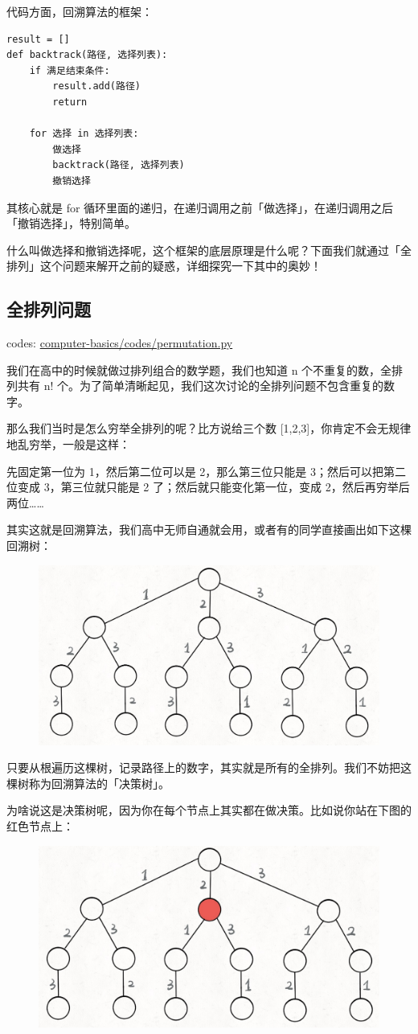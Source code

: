\documentclass[12pt]{article}
\begin{document}
代码方面，回溯算法的框架：
\begin{lstlisting}
result = []
def backtrack(路径, 选择列表):
    if 满足结束条件:
        result.add(路径)
        return
    
    for 选择 in 选择列表:
        做选择
        backtrack(路径, 选择列表)
        撤销选择
\end{lstlisting}

其核心就是 for 循环里面的递归，在递归调用之前「做选择」，在递归调用之后「撤销选择」，特别简单。

什么叫做选择和撤销选择呢，这个框架的底层原理是什么呢？下面我们就通过「全排列」这个问题来解开之前的疑惑，详细探究一下其中的奥妙！

\subsection{全排列问题}
codes: \url{computer-basics/codes/permutation.py}

我们在高中的时候就做过排列组合的数学题，我们也知道 n 个不重复的数，全排列共有 n! 个。为了简单清晰起见，我们这次讨论的全排列问题不包含重复的数字。

那么我们当时是怎么穷举全排列的呢？比方说给三个数 [1,2,3]，你肯定不会无规律地乱穷举，一般是这样：

先固定第一位为 1，然后第二位可以是 2，那么第三位只能是 3；然后可以把第二位变成 3，第三位就只能是 2 了；然后就只能变化第一位，变成 2，然后再穷举后两位……

其实这就是回溯算法，我们高中无师自通就会用，或者有的同学直接画出如下这棵回溯树：
\begin{figure}[H]
    \centering
    \includegraphics[width=.5\textwidth]{fig/Backtrack_1.png}
\end{figure}

只要从根遍历这棵树，记录路径上的数字，其实就是所有的全排列。我们不妨把这棵树称为回溯算法的「决策树」。

为啥说这是决策树呢，因为你在每个节点上其实都在做决策。比如说你站在下图的红色节点上：
\begin{figure}[H]
    \centering
    \includegraphics[width=.5\textwidth]{fig/Backtrack_2.png}
\end{figure}
\end{document}
